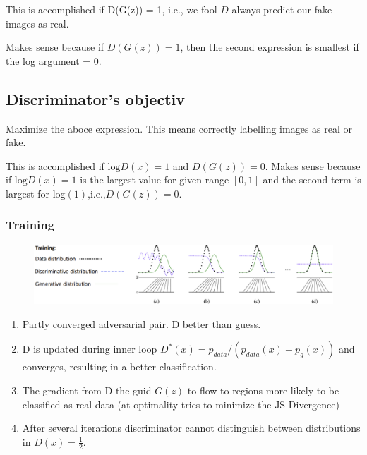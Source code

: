 This is accomplished if D(G(z)) = 1, i.e., we fool \(D\) always predict our fake images as real.

Makes sense because if \(D(G(z)) = 1\), then the second expression is smallest if the log argument = 0.

\subsection*{Discriminator's objectiv}
Maximize the aboce expression.
This means correctly labelling images as real or fake.

This is accomplished if \(\text{log}D(x) = 1\) and \(D(G(z)) = 0\).
Makes sense because if \(\text{log}D(x) = 1\) is the largest value for given range \(\left[ 0,1\right]\) and the second term is largest for log\((1)\),i.e.,\(D(G(z)) = 0\).

\subsubsection{Training}
\begin{figure}[!h]
    \includegraphics[width = \columnwidth]{figures/GenAI3/TrainingGAN.png}
\end{figure}

\begin{enumerate}[label = (\alph*)]
    \item Partly converged adversarial pair. D better than guess.
    \item D is updated during inner loop \(D^*(x) = p_{data} /(p_{data}(x)+p_g(x))\) and converges, resulting in a better classification.
    \item The gradient from D the guid \(G(z)\) to flow to regions more likely to be classified as real data (at optimality tries to minimize the JS Divergence)
    \item After several iterations discriminator cannot distinguish between distributions in \(D(x) = \frac{1}{2}\).
\end{enumerate}

